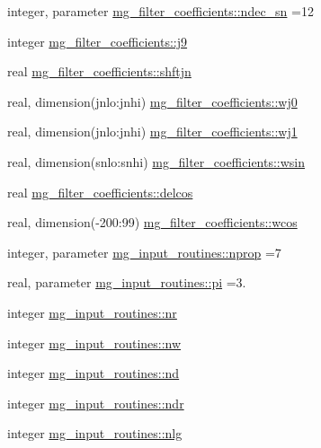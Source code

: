 \begin{DoxyCompactItemize}
\item 
integer, parameter \hyperlink{namespacemg__filter__coefficients_aa6265b0922421eec8712cb53247cbd03}{mg\+\_\+filter\+\_\+coefficients\+::ndec\+\_\+sn} =12
\item 
integer \hyperlink{namespacemg__filter__coefficients_adbf6624b4de7760282e3a9be6a59938a}{mg\+\_\+filter\+\_\+coefficients\+::j9}
\item 
real \hyperlink{namespacemg__filter__coefficients_afdd6d43570da7c2de03a1bf3f6cb2871}{mg\+\_\+filter\+\_\+coefficients\+::shftjn}
\item 
real, dimension(jnlo\+:jnhi) \hyperlink{namespacemg__filter__coefficients_afb7b9b7a8195490bfa6a293abd5493b3}{mg\+\_\+filter\+\_\+coefficients\+::wj0}
\item 
real, dimension(jnlo\+:jnhi) \hyperlink{namespacemg__filter__coefficients_ae70ba1c8ff8f09c80e97f66ce47ba300}{mg\+\_\+filter\+\_\+coefficients\+::wj1}
\item 
real, dimension(snlo\+:snhi) \hyperlink{namespacemg__filter__coefficients_ae1e06a63bc231676d15e2ddc1871f2c8}{mg\+\_\+filter\+\_\+coefficients\+::wsin}
\item 
real \hyperlink{namespacemg__filter__coefficients_a50fb8fcb38f753db2bf4a2d8dae9882c}{mg\+\_\+filter\+\_\+coefficients\+::delcos}
\item 
real, dimension(-\/200\+:99) \hyperlink{namespacemg__filter__coefficients_a650f935ee4aed00905ba989f7d6a0565}{mg\+\_\+filter\+\_\+coefficients\+::wcos}
\item 
integer, parameter \hyperlink{namespacemg__input__routines_acf657285a9116a36f49eb1716a79e4f7}{mg\+\_\+input\+\_\+routines\+::nprop} =7
\item 
real, parameter \hyperlink{namespacemg__input__routines_a6019c1c31f9a86b8262747f0a7135528}{mg\+\_\+input\+\_\+routines\+::pi} =3.
\item 
integer \hyperlink{namespacemg__input__routines_a14058337aef87178d8a8d770a11a66d9}{mg\+\_\+input\+\_\+routines\+::nr}
\item 
integer \hyperlink{namespacemg__input__routines_ab9a730544640a32be864e9b3dda89e4e}{mg\+\_\+input\+\_\+routines\+::nw}
\item 
integer \hyperlink{namespacemg__input__routines_a310ddcda277a3a2743d7709cccdf9007}{mg\+\_\+input\+\_\+routines\+::nd}
\item 
integer \hyperlink{namespacemg__input__routines_a494cce161b67dc2a3a628e7ce33d35d0}{mg\+\_\+input\+\_\+routines\+::ndr}
\item 
integer \hyperlink{namespacemg__input__routines_a02fb693b7d09302d47008f0a381ea329}{mg\+\_\+input\+\_\+routines\+::nlg}

\end{DoxyCompactItemize}
